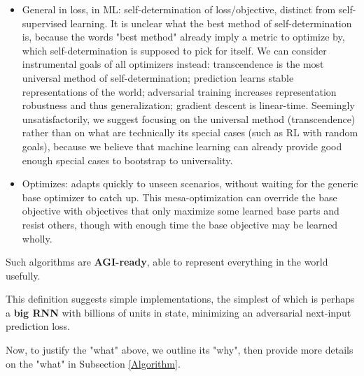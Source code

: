 \documentclass{article}
\begin{document}
\begin{itemize}
\begin{itemize}
\item General in loss, in ML: self-determination of loss/objective, distinct from self-supervised learning. It is unclear what the best method of self-determination is, because the words "best method" already imply a metric to optimize by, which self-determination is supposed to pick for itself. We can consider instrumental goals of all optimizers instead: transcendence is the most universal method of self-determination; prediction learns stable representations of the world; adversarial training increases representation robustness and thus generalization; gradient descent is linear-time. Seemingly unsatisfactorily, we suggest focusing on the universal method (transcendence) rather than on what are technically its special cases (such as RL with random goals), because we believe that machine learning can already provide good enough special cases to bootstrap to universality.
\item Optimizes: adapts quickly to unseen scenarios, without waiting for the generic base optimizer to catch up. This mesa-optimization can override the base objective with objectives that only maximize some learned base parts and resist others, though with enough time the base objective may be learned wholly.
\end{itemize}
\end{itemize}

Such algorithms are \textbf{AGI-ready}, able to represent everything in the world usefully.

This definition suggests simple implementations, the simplest of which is perhaps a \textbf{big RNN} with billions of units in state, minimizing an adversarial next-input prediction loss.

Now, to justify the "what" above, we outline its "why", then provide more details on the "what" in Subsection \ref{Algorithm}.
\end{document}
